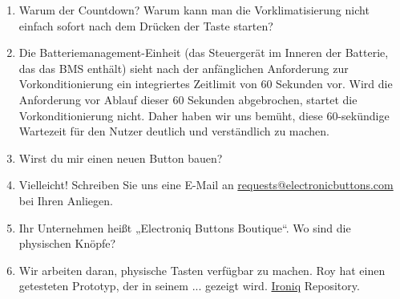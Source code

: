 \documentclass[superscriptaddress,onecolumn,floatfix]{revtex4-2}
\begin{document}
\begin{enumerate}
  \item[F:] Warum der Countdown? Warum kann man die Vorklimatisierung nicht einfach sofort nach dem Drücken der Taste starten?
  \item[A:] Die Batteriemanagement-Einheit (das Steuergerät im Inneren der Batterie, das das BMS enthält) sieht nach der anfänglichen Anforderung zur Vorkonditionierung ein integriertes Zeitlimit von 60 Sekunden vor. Wird die Anforderung vor Ablauf dieser 60 Sekunden abgebrochen, startet die Vorkonditionierung nicht. Daher haben wir uns bemüht, diese 60-sekündige Wartezeit für den Nutzer deutlich und verständlich zu machen.
  \item[F:] Wirst du mir einen neuen Button bauen?
  \item[A:] Vielleicht! Schreiben Sie uns eine E-Mail an \href{mailto:requests@electroniqbuttons.com}{requests@electronicbuttons.com} bei Ihren Anliegen.
  \item[F:] Ihr Unternehmen heißt „Electroniq Buttons Boutique“. Wo sind die physischen Knöpfe?
  \item[A:] Wir arbeiten daran, physische Tasten verfügbar zu machen. Roy hat einen getesteten Prototyp, der in seinem ... gezeigt wird. \href{https://github.com/dragz/ironiq}{Ironiq} Repository.
\end{enumerate}
\appendix 

{}
\end{document}
